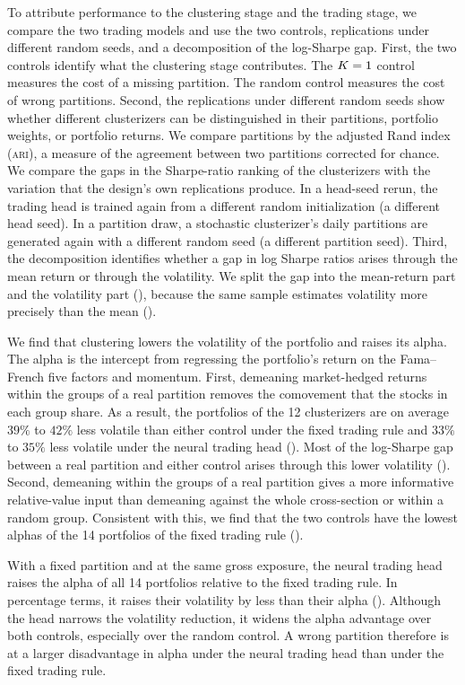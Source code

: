 To attribute performance to the clustering stage and the trading stage, we compare the two trading models and use the two controls, replications under different random seeds, and a decomposition of the log-Sharpe gap. First, the two controls identify what the clustering stage contributes. The $K=1$ control measures the cost of a missing partition. The random control measures the cost of wrong partitions. Second, the replications under different random seeds show whether different clusterizers can be distinguished in their partitions, portfolio weights, or portfolio returns. We compare partitions by the adjusted Rand index (\textsc{ari}), a measure of the agreement between two partitions corrected for chance. We compare the gaps in the Sharpe-ratio ranking of the clusterizers with the variation that the design's own replications produce. In a head-seed rerun, the trading head is trained again from a different random initialization (a different head seed). In a partition draw, a stochastic clusterizer's daily partitions are generated again with a different random seed (a different partition seed). Third, the decomposition identifies whether a gap in log Sharpe ratios arises through the mean return or through the volatility. We split the gap into the mean-return part and the volatility part (), because the same sample
estimates volatility more precisely than the mean ().

We find that clustering lowers the volatility of the portfolio and raises its alpha. The alpha is the intercept from regressing the portfolio's return on the Fama--French five factors and momentum. First, demeaning market-hedged returns within the groups of a real partition removes the comovement that the stocks in each group share. As a result, the portfolios of the 12 clusterizers are on average $39\%$ to $42\%$ less volatile than either control under the fixed trading rule and $33\%$ to $35\%$ less volatile under the neural trading head (). Most of the log-Sharpe gap between a real partition and either control arises through this lower volatility (). Second, demeaning within the groups of a real partition gives a more informative relative-value input than demeaning against the whole cross-section or within a random group. Consistent with this, we find that the two controls have the lowest alphas of the 14 portfolios of the fixed trading rule ().

With a fixed partition and at the same gross exposure, the neural trading head raises the alpha of all 14 portfolios relative to the fixed trading rule. In percentage terms, it raises their volatility by less than their alpha (). Although the head narrows the volatility reduction, it widens the alpha advantage over both controls, especially over the random control. A wrong partition therefore is at a larger disadvantage in alpha under the neural trading head than under the fixed trading rule.

